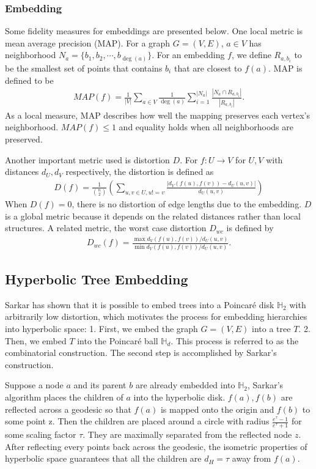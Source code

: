 \subsubsection{Embedding}
Some fidelity measures for embeddings are presented below. One local metric is mean average precision (MAP). For a graph $G = (V, E)$, $a \in V$ has neighborhood $N_a = \{b_1, b_2, \cdots, b_{\deg(a)}\}$. For an embedding $f$, we define $R_{a, b_i}$ to be the smallest set of points that contains $b_i$ that are closest to $f(a)$. MAP is defined to be 
\begin{align*}
    MAP(f) = \frac{1}{|V|} \sum_{a\in V}\frac{1}{\deg(a)} \sum^{|N_a|}_{i=1}\frac{|N_a \cap R_{a, b_i}|}{|R_{a, b_i}|}.
\end{align*}
As a local measure, MAP describes how well the mapping preserves each vertex's neighborhood. $MAP(f) \leq 1$ and equality holds when all neighborhoods are preserved. 

Another important metric used is distortion $D$. For $f:U\rightarrow V$ for $U, V$ with distances $d_U, d_V$ respectively, the distortion is defined as
\begin{align*}
    D(f) = \frac{1}{\binom{n}{2}}\left(\sum_{u, v \in U, u != v}\frac{|d_V(f(u), f(v)) - d_U(u, v)|}{d_U(u, v)}\right)
\end{align*}
When $D(f) = 0$, there is no distortion of edge lengths due to the embedding. $D$ is a global metric because it depends on the related distances rather than local structures. A related metric, the worst case distortion $D_{wc}$ is defined by
\begin{align*}
    D_{wc}(f) = \frac{\max d_V(f(u), f(v))/d_U(u, v)}{\min d_V(f(u), f(v))/d_U(u, v)}.
\end{align*}


\subsection{Hyperbolic Tree Embedding}
Sarkar has shown that it is possible to embed trees into a Poincar\'e disk $\mathbb{H}_2$ with arbitrarily low distortion, which motivates the process for embedding hierarchies into hyperbolic space: 1. First, we embed the graph $G = (V, E)$ into a tree $T$. 2. Then, we embed $T$ into the Poincar\'e ball $\mathbb{H}_d$. This process is referred to as the combinatorial construction. The second step is accomplished by Sarkar's construction. 

Suppose a node $a$ and its parent $b$ are already embedded into $\mathbb{H}_2$, Sarkar's algorithm places the children of $a$ into the hyperbolic disk. $f(a), f(b)$ are reflected across a geodesic so that $f(a)$ is mapped onto the origin and $f(b)$ to some point z. Then the children are placed around a circle with radius $\frac{e^\tau - 1}{e^\tau + 1}$ for some scaling factor $\tau$. They are maximally separated from the reflected node $z$. After reflecting every points back across the geodesic, the isometric properties of hyperbolic space guarantees that all the children are $d_H = \tau$ away from $f(a)$. 


